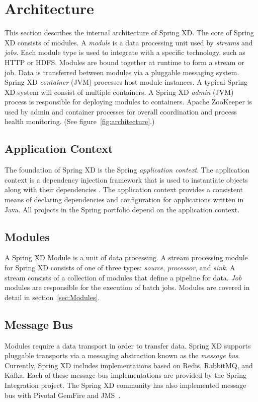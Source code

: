 \section{Architecture}
This section describes the internal architecture of Spring XD. The core of
Spring XD consists of modules. A \emph{module}\cite{modules} is a data processing
unit used by \emph{streams} and \emph{jobs}. Each module type is used to integrate with a specific
technology, such as HTTP or HDFS. Modules are bound together at runtime
to form a stream or job. Data is transferred between modules via a pluggable
messaging system. Spring XD \emph{container} (JVM) processes host module instances.
A typical Spring XD system will consist of multiple containers. A Spring XD
\emph{admin} (JVM) process is responsible for deploying modules to containers.
Apache ZooKeeper\cite{zookeeper} is used by admin and container processes
for overall coordination and process health monitoring. 
(See figure~\ref{fig:architecture}.)

\subsection{Application Context}
The foundation of Spring XD is the Spring \emph{application context}. The application
context is a dependency injection framework that is used to instantiate
objects along with their dependencies \cite{spring-framework-reference}.
The application context provides a consistent means of declaring dependencies
and configuration for applications written in Java. All projects in the
Spring\cite{spring} portfolio depend on the application context.

\subsection{Modules}
A Spring XD Module is a unit of data processing. A stream processing module
for Spring XD consists of one of three types: \emph{source}, \emph{processor}, and \emph{sink}.
A stream consists of a collection of modules that define a pipeline for data.
\emph{Job} modules are responsible for the execution of batch jobs. Modules are
covered in detail in section~\ref{sec:Modules}.

\subsection{Message Bus}
\label{subsec:MessageBus}
Modules require a data transport in order to transfer data. Spring XD
supports pluggable transports via a messaging abstraction known as 
the \emph{message bus}. Currently, Spring XD includes implementations based
on Redis\cite{redis}, RabbitMQ\cite{rabbitmq}, and Kafka. Each of these message
bus implementations are provided by the Spring Integration
project\cite{spring-integration-reference}. The Spring XD community has also
implemented message bus with Pivotal GemFire and JMS~\cite{messagebus-jms}.

